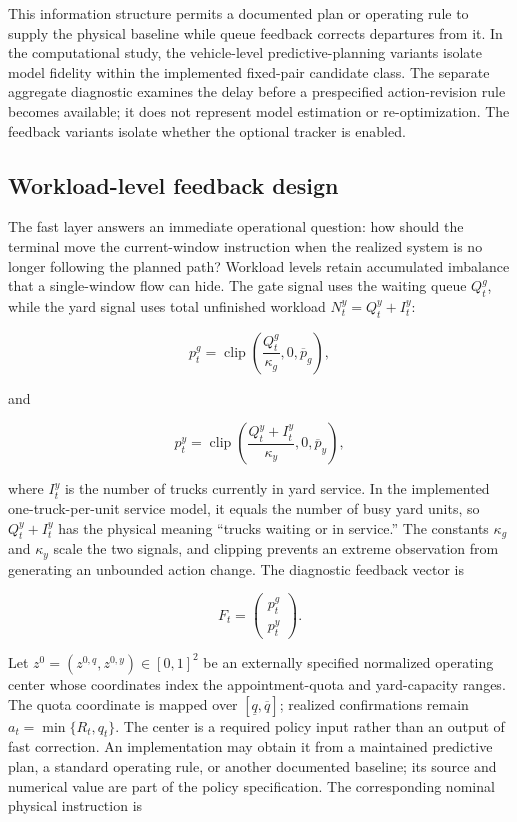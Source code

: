 \documentclass[preprint,12pt,authoryear,a4paper]{elsarticle}
\begin{document}
This information structure permits a documented plan or operating rule to supply the physical baseline while queue feedback corrects departures from it. In the computational study, the vehicle-level predictive-planning variants isolate model fidelity within the implemented fixed-pair candidate class. The separate aggregate diagnostic examines the delay before a prespecified action-revision rule becomes available; it does not represent model estimation or re-optimization. The feedback variants isolate whether the optional tracker is enabled.

\subsection{Workload-level feedback design}
\label{subsec:4-2-workload-level-feedback-design}

The fast layer answers an immediate operational question: how should the terminal move the current-window instruction when the realized system is no longer following the planned path? Workload levels retain accumulated imbalance that a single-window flow can hide. The gate signal uses the waiting queue \(Q_t^g\), while the yard signal uses total unfinished workload \(N_t^y=Q_t^y+I_t^y\):

\[
p_t^g=\operatorname{clip}\left(\frac{Q_t^g}{\kappa_g},0,\overline p_g\right),
\tag{11}
\]

and

\[
p_t^y=\operatorname{clip}\left(
\frac{Q_t^y+I_t^y}{\kappa_y},0,\overline p_y
\right),
\tag{12}
\]

where \(I_t^y\) is the number of trucks currently in yard service. In the implemented one-truck-per-unit service model, it equals the number of busy yard units, so \(Q_t^y+I_t^y\) has the physical meaning ``trucks waiting or in service.'' The constants \(\kappa_g\) and \(\kappa_y\) scale the two signals, and clipping prevents an extreme observation from generating an unbounded action change. The diagnostic feedback vector is

\[
F_t=
\begin{pmatrix}
p_t^g\\
p_t^y
\end{pmatrix}.
\tag{13}
\]

Let \(z^0=(z^{0,q},z^{0,y})\in[0,1]^2\) be an externally specified normalized operating center whose coordinates index the appointment-quota and yard-capacity ranges. The quota coordinate is mapped over \([\underline q,\overline q]\); realized confirmations remain \(a_t=\min\{R_t,q_t\}\). The center is a required policy input rather than an output of fast correction. An implementation may obtain it from a maintained predictive plan, a standard operating rule, or another documented baseline; its source and numerical value are part of the policy specification. The corresponding nominal physical instruction is
\end{document}
